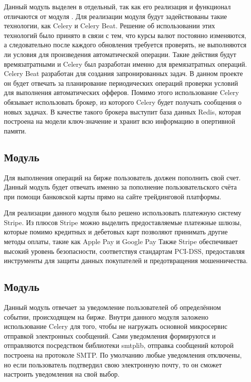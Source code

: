 Данный модуль выделен в отдельный, так как его реализация и функционал отличаются от модуля \moduleTrading.
Для реализации модуля будут задействованы такие технологии, как Celery и Celery Beat.
Решение об использовании этих технологий было принято в связи с тем, что курсы валют постоянно изменяются, а следовательно после каждого обновления требуется проверять, не выполняются ли условия для произведения автоматической операции.
Такие действия будут времязатратными и Celery был разработан именно для времязатратных операций.
Celery Beat разработан для создания запронированных задач.
В данном проекте он будет отвечать за планирование периодических операций проверки условий для выполнения автоматических офферов.
Помимо этого использование Celery обязывает использовать брокер, из которого Celery будет получать сообщения о новых задачах.
В качестве такого брокера выступит база данных Redis\cite{redis_docs}, которая построена на модели ключ-значение и хранит всю информацию в опертивной памяти.

\subsection{Модуль \moduleStripe}\label{subsec:sys:stripe}
Для выполнения операций на бирже пользователь должен пополнить свой счет.
Данный модуль будет отвечать именно за пополнение пользовательского счёта при помощи банковской карты прямо на сайте трейдинговой платформы.

Для реализации данного модуля было решено использовать платежную систему Stripe.
Из плюсов Stripe можно выделить предоставляемые платежные шлюзы, которые помимо кредитных и дебетовых карт позволяют принимать другие методы оплаты, такие как Apple Pay и Google Pay
Также Stripe обеспечивает высокий уровень безопасности, соответствуя стандартам PCI-DSS, предоставляя инструменты для защиты данных покупателей и предотвращения мошенничества.


\subsection{Модуль \moduleNotifications}\label{subsec:-module-notifications}
Данный модуль отвечает за уведомление пользователей об определённом событии, происходящем на бирже.
Внутри данного модуля заложено использование Celery для того, чтобы не нагружать основной микросервис отправкой электронных сообщений.
Сами уведомления формируются и отправляются посредством библиотеки smtplib, отправка сообщений которой построена на протоколе SMTP.
По умолчанию любые уведомления отключены, но если пользователь подтвердил свою электронную почту, то он сможет настроить уведомления на свой выбор.

